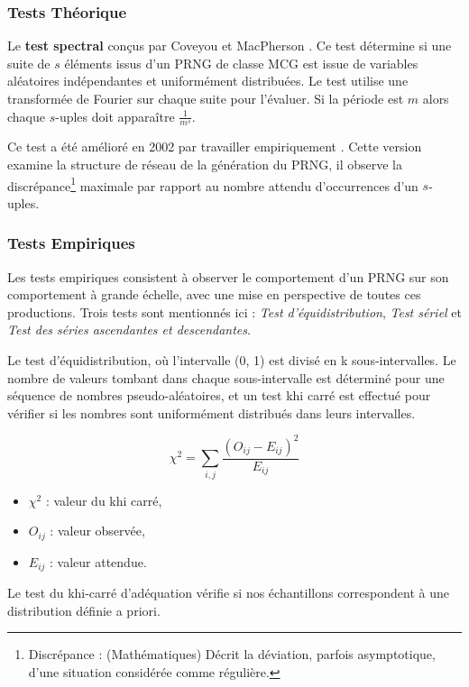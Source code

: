 \documentclass[9pt,a4paper,twoside,english]{class/backend}
\begin{document}
    \subsubsection{Tests Théorique}\smallskip

    \hspace{10pt}Le \textbf{test spectral} conçus par Coveyou et MacPherson \cite{spectralTest}. Ce test détermine si une suite de $s$ éléments issus d'un PRNG de classe MCG est issue de variables aléatoires indépendantes et uniformément distribuées. Le test utilise une transformée de Fourier sur chaque suite pour l'évaluer. Si la période est $m$ alors chaque $s$-uples doit apparaître $\frac{1}{m^s}$.

   Ce test a été amélioré en 2002 par travailler empiriquement \cite{EmpiricalSpectraltest}. Cette version examine la structure de réseau de la génération du PRNG, il observe la discrépance\footnote{Discrépance : (Mathématiques) Décrit la déviation, parfois asymptotique, d'une situation considérée comme régulière.} maximale par rapport au nombre attendu d'occurrences d'un $s$-uples.
    

    \subsubsection{Tests Empiriques}

    Les tests empiriques consistent à observer le comportement d'un PRNG sur son comportement à grande échelle, avec une mise en perspective de toutes ces productions. Trois tests sont mentionnés ici \cite{MonteCarloPRNG} : \textit{Test d’équidistribution}, \textit{Test sériel} et \textit{Test des séries ascendantes et descendantes}. 
    
    Le test d'équidistribution, où l'intervalle (0, 1) est divisé en k sous-intervalles. Le nombre de valeurs tombant dans chaque sous-intervalle est déterminé pour une séquence de nombres pseudo-aléatoires, et un test khi carré est effectué pour vérifier si les nombres sont uniformément distribués dans leurs intervalles.

    \begin{rhoenv}[frametitle = {Test du khi carré ou $\chi^2$ \cite{khi-deux}}]
        \[
            \chi^2 = \sum_{i, j} \frac{(O_{ij} - E_{ij})^2}{E_{ij}}
        \]
        \begin{itemize}
            \item \( \chi^2 \) : valeur du khi carré,
            \item \( O_{ij} \) : valeur observée,
            \item \( E_{ij} \) : valeur attendue.
        \end{itemize}
        Le test du khi-carré d'adéquation vérifie si nos échantillons correspondent à une distribution définie a priori.
    \end{rhoenv}
\end{document}
